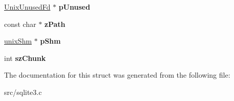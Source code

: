 \begin{DoxyCompactItemize}
\item 
\hypertarget{structunix_file_a3820ccead5805d2ea61ca1c752646852}{\hyperlink{struct_unix_unused_fd}{Unix\-Unused\-Fd} $\ast$ {\bfseries p\-Unused}}\label{structunix_file_a3820ccead5805d2ea61ca1c752646852}

\item 
\hypertarget{structunix_file_afc5eff0948d553308cf90a79d4a06f17}{const char $\ast$ {\bfseries z\-Path}}\label{structunix_file_afc5eff0948d553308cf90a79d4a06f17}

\item 
\hypertarget{structunix_file_a53c653bd73cdc6f518ecffe95062e91a}{\hyperlink{structunix_shm}{unix\-Shm} $\ast$ {\bfseries p\-Shm}}\label{structunix_file_a53c653bd73cdc6f518ecffe95062e91a}

\item 
\hypertarget{structunix_file_a5f6307d3446ce1b149df756c00c3bd2e}{int {\bfseries sz\-Chunk}}\label{structunix_file_a5f6307d3446ce1b149df756c00c3bd2e}

\end{DoxyCompactItemize}


The documentation for this struct was generated from the following file\-:\begin{DoxyCompactItemize}
\item 
src/sqlite3.\-c\end{DoxyCompactItemize}
